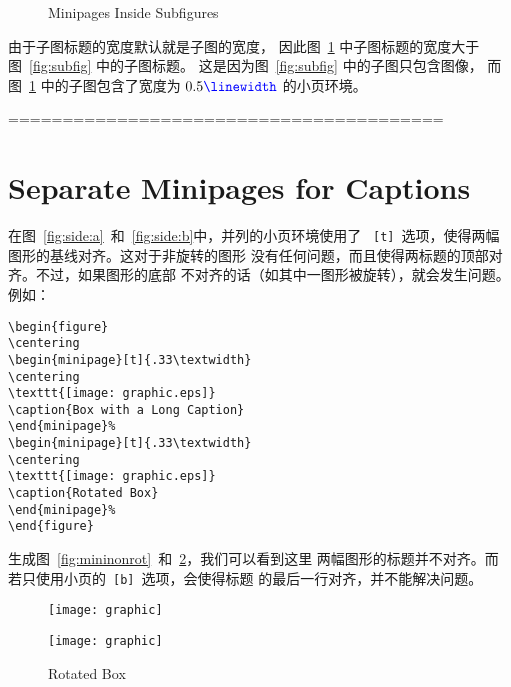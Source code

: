 \begin{figure}
		\hfill
			\caption{Minipages Inside Subfigures}
			\label{fig:mini:subfig} %
		\end{figure}

由于子图标题的宽度默认就是子图的宽度，
因此图~\ref{fig:mini:subfig} 中子图标题的宽度大于图~\ref{fig:subfig} 中的子图标题。
这是因为图~\ref{fig:subfig} 中的子图只包含图像，
而图~\ref{fig:mini:subfig} 中的子图包含了宽度为 $0.5\text{{\textcolor{blue}{\texttt{\textbackslash linewidth}}}}$ 的小页环境。

========================================
\section{Separate Minipages for Captions}


在图~\ref{fig:side:a}~和~\ref{fig:side:b}中，并列的小页环境使用了
~\texttt{[t]}~选项，使得两幅图形的基线对齐。这对于非旋转的图形
没有任何问题，而且使得两标题的顶部对齐。不过，如果图形的底部
不对齐的话（如其中一图形被旋转），就会发生问题。例如：
\begin{Verbatim}[xleftmargin=1cm]
\begin{figure} 
\centering 
\begin{minipage}[t]{.33\textwidth} 
\centering 
\texttt{[image: graphic.eps]} 
\caption{Box with a Long Caption} 
\end{minipage}% 
\begin{minipage}[t]{.33\textwidth} 
\centering 
\texttt{[image: graphic.eps]} 
\caption{Rotated Box} 
\end{minipage}% 
\end{figure}
\end{Verbatim}
生成图~\ref{fig:mininonrot}~和~\ref{fig:minirot}，我们可以看到这里
两幅图形的标题并不对齐。而若只使用小页的~\texttt{[b]}~选项，会使得标题
的最后一行对齐，并不能解决问题。

\begin{figure} 
	\centering 
	\begin{minipage}[t]{.33\textwidth} 
		\centering 
		\texttt{[image: graphic]} 
		\caption{Box with a Long Caption}\label{fig:mininonrot} 
	\end{minipage}%
	\begin{minipage}[t]{.33\textwidth} 
		\centering 
		\texttt{[image: graphic]} 
		\caption{Rotated Box}\label{fig:minirot} 
	\end{minipage}%
\end{figure}

